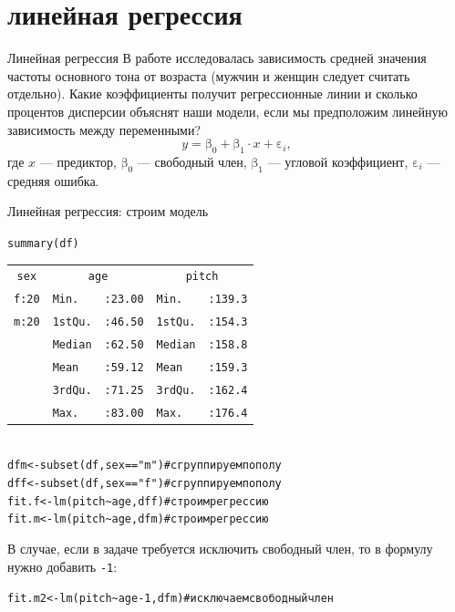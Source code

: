\section{линейная регрессия}
\begin{frame}{Линейная регрессия}
В работе исследовалась зависимость средней значения частоты основного тона от возраста (мужчин и женщин следует считать отдельно). Какие коэффициенты получит регрессионные линии и сколько процентов дисперсии объяснят наши модели, если мы предположим линейную зависимость между переменными?\pause
\vfill
$$y=\mbox{β}_0+\mbox{β}_1\cdot x+\mbox{ε}_i,$$
где $x$  — предиктор, $\mbox{β}_0$  — свободный член, $\mbox{β}_1$  — угловой коэффициент, $\mbox{ε}_i$  — средняя ошибка.
\vfill

\end{frame}
\begin{frame}{Линейная регрессия: строим модель}
\scriptsize
\begin{alltt}
\alert{summary(df)}\\
\begin{tabular}{lllll}
\multicolumn{1}{c}{sex} & \multicolumn{2}{c}{age} & \multicolumn{2}{c}{pitch} \\
f:20                    & Min.        & :23.00    & Min.         & :139.3     \\
m:20                    & 1st Qu.     & :46.50    & 1st Qu.      & :154.3     \\
                        & Median      & :62.50    & Median       & :158.8     \\
                        & Mean        & :59.12    & Mean         & :159.3     \\
                        & 3rd Qu.     & :71.25    & 3rd Qu.      & :162.4     \\
                        & Max.        & :83.00    & Max.         & :176.4    
\end{tabular}
\bigskip \\
dfm <- subset(df, sex=="m") \hfill \# сгруппируем по полу\\
dff <- subset(df, sex=="f")  \hfill \# сгруппируем по полу \bigskip \\
fit.f <- \alert{lm(pitch\textasciitilde age, dff)} \hfill \# cтроим регрессию\\
fit.m <- \alert{lm(pitch\textasciitilde age, dfm)} \hfill \# cтроим регрессию\\
\end{alltt}
\normalsize
\vfill
В случае, если в задаче требуется исключить свободный член, то в формулу нужно добавить \scriptsize\verb"-1"\normalsize:
\scriptsize
\begin{alltt}
fit.m2 <- \alert{lm(pitch\textasciitilde age - 1, dfm)} \hfill \# исключаем свободный член\\
\end{alltt}
\normalsize
\end{frame}
